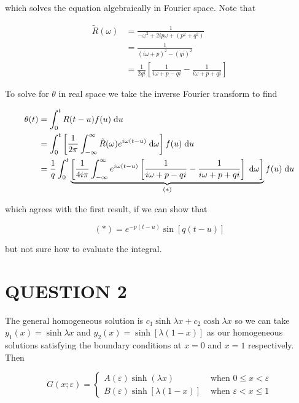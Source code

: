 \documentclass[a4paper]{article}
\begin{document}
\begin{itemize}
	which solves the equation algebraically in Fourier space. Note that
	
	\begin{align*}
	\tilde{R}(\omega) & = \frac{1}{-\omega^{2} + 2 i p \omega + (p^{2} + q^{2}) } \\
	& = \frac{1}{(i \omega  + p)^{2} - (q i)^{2}  } \\
	& = \frac{1}{2qi} \left[  \frac{1}{ i \omega + p - qi } - \frac{1}{ i \omega  + p + qi }    \right] 
	\end{align*}
	
	To solve for $ \theta $ in real space we take the inverse Fourier transform to find 
	
	\begin{align*}
	\theta(t) & = \int_{0}^{t} R(t - u)f(u) \; \mathrm{d} u \\
	& = \int_{0}^{t} \left[  \frac{1}{2 \pi} \int_{- \infty}^{\infty} \tilde{R}(\omega) e^{i\omega(t-u)} \; \mathrm{d} \omega   \right] f(u) \; \mathrm{d} u \\
	& = \frac{1}{q} \int_{0}^{t} \underbrace{\left[  \frac{1}{4 i \pi}  \int_{- \infty}^{\infty}   e^{i\omega(t-u)}  \left[  \frac{1}{ i \omega + p - qi } - \frac{1}{ i \omega  + p + qi }    \right]  \; \mathrm{d} \omega   \right]}_{(*)} f(u) \; \mathrm{d} u 
	\end{align*}
	
	which agrees with the first result, if we can show that 
	
	\[ (*) = e^{-p(t-u)} \sin[ q(t - u) ] \]
	
	but not sure how to evaluate the integral.
	
	
\end{itemize}

\section{QUESTION 2}

The general homogeneous solution is $ c_{1} \sinh \lambda x + c_{2} \cosh \lambda x $ so we can take $ y_{1}(x) = \sinh \lambda x $ and $ y_{2}(x) = \sinh[\lambda(1-x)] $ as our homogeneous solutions satisfying the boundary conditions at $ x = 0 $ and $ x = 1 $ respectively. Then 

\[ G(x; \varepsilon) = \begin{cases} A(\varepsilon) \sinh( \lambda x)  & \text{ when } 0 \leq x  < \varepsilon \\  B(\varepsilon) \sinh[\lambda(1-x)]  & \text{ when } \varepsilon < x \leq 1 \end{cases} \]
\end{document}
